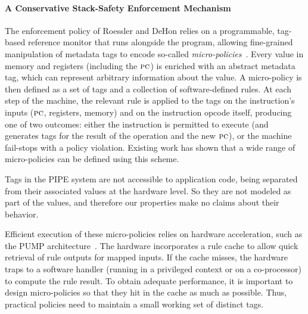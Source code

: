 \documentclass[10pt,conference]{ieeetran}%
\theoremstyle{definition}
\begin{document}
{\paragraph*{A Conservative Stack-Safety Enforcement Mechanism}
%
The enforcement policy of Roessler and DeHon \cite{DBLP:conf/sp/RoesslerD18} relies
on a programmable, tag-based reference monitor that runs alongside the
program,
allowing fine-grained manipulation of metadata tags to encode so-called
\emph{micro-policies}~\cite{pump_oakland2015}.
Every value in
memory and registers (including the $\textsc{pc}$)
is enriched with an abstract metadata tag, which can represent
arbitrary information about the value. A micro-policy is then defined as a
set of tags and a
collection of software-defined rules.
At each step of the machine, the relevant rule is applied to the tags on
the instruction's inputs ($\textsc{pc}$, registers, memory) and on the
instruction opcode itself, producing
one of two outcomes: either the instruction is permitted to execute (and
generates tags for the result of the operation and the new $\textsc{pc}$), or
the machine fail-stops with a policy violation.
Existing work \cite{TestingNI:ICFP,pump_oakland2015, DBLP:conf/sp/RoesslerD18}
has shown that a wide range of
micro-policies can be defined using this scheme.

Tags in the PIPE system are not accessible to application code, being separated
from their associated values at the hardware level. So they are not modeled
as part of the values, and therefore our properties make no claims about
their behavior.

Efficient execution of these micro-policies relies on hardware acceleration,
such as the PUMP architecture~\cite{pump:asplos2015}.
The hardware incorporates a rule cache
to allow quick retrieval of rule outputs for mapped inputs. If the cache misses,
the hardware traps to a software handler (running in a privileged context or
on a co-processor) to compute the rule result. To obtain adequate performance,
it is important to design micro-policies so that they hit in the cache as
much as possible. Thus, practical policies need to maintain a small working
set of distinct tags.


}
\end{document}
